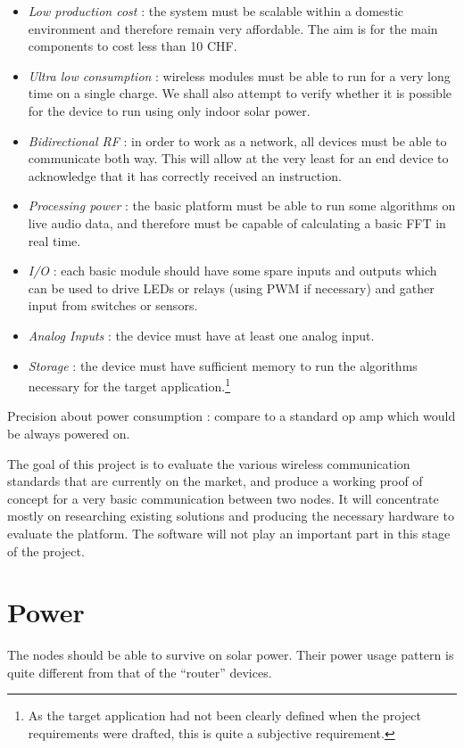 \begin{itemize}
  \item \emph{Low production cost} : the system must be scalable within
    a domestic environment and therefore remain very affordable. The aim is for
    the main components to cost less than 10 CHF. %
  \item \emph{Ultra low consumption} : wireless modules must be able to run for
    a very long time on a single charge. We shall also attempt to verify
    whether it is possible for the device to run using only indoor solar power.
  \item \emph{Bidirectional RF} : %
    in order to work as a network, all devices must be able to communicate both
    way. This will allow at the very least for an end device to acknowledge
    that it has correctly received an instruction.
  \item \emph{Processing power} : the basic platform must be able to run some
    algorithms on live audio data, and therefore must be capable of calculating
    a basic \ac{FFT} in real time.
  \item \emph{I/O} : each basic module should have some spare inputs and
    outputs which can be used to drive LEDs or relays (using \ac{PWM} if
    necessary) and gather input from switches or sensors.
  \item \emph{Analog Inputs} : the device must have at least one analog input.
  \item \emph{Storage} : the device must have sufficient memory to run the
    algorithms necessary for the target application.\footnote{As the target
    application had not been clearly defined when the project requirements were
    drafted, this is quite a subjective requirement.}
\end{itemize}


Precision about power consumption : compare to a standard op amp which would be
always powered on.

The goal of this project is to evaluate the various wireless communication
standards that are currently on the market, and produce a working proof of
concept for a very basic communication between two nodes. It will concentrate
mostly on researching existing solutions and producing the necessary hardware to
evaluate the platform. The software will not play an important part in this
stage of the project.

\section{Power}\label{sec:power}


The nodes should be able to survive on solar power. Their power usage pattern
is quite different from that of the ``router'' devices. %
